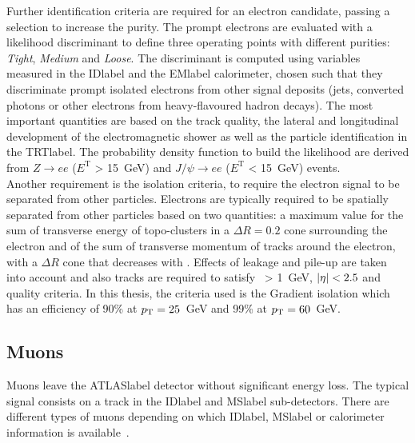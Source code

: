 Further identification criteria are required for an electron candidate, passing a selection to increase the purity. The prompt electrons are evaluated with a likelihood discriminant to define three operating points with different purities: \textit{Tight}, \textit{Medium} and \textit{Loose}. The discriminant is computed using variables measured in the \acrshort{IDlabel} and the \acrshort{EMlabel} calorimeter, chosen such that they discriminate prompt isolated electrons from other signal deposits (jets, converted photons or other electrons from heavy-flavoured hadron decays). The most important quantities are based on the track quality, the lateral and longitudinal development of the electromagnetic shower as well as the particle identification in the \acrshort{TRTlabel}. The probability density function to build the likelihood are derived from $Z\rightarrow ee$ ($E^\text{T}$ > 15~GeV) and $J/\psi \rightarrow ee$ ($E^\text{T}$ < 15~GeV) events.\\

Another requirement is the isolation criteria, to require the electron signal to be separated from other particles. Electrons are typically required to be spatially separated from other particles based on two quantities: a maximum value for the sum of transverse energy of topo-clusters in a $\Delta R=0.2$ cone surrounding the electron and of the sum of transverse momentum of tracks around the electron, with a $\Delta R$ cone that decreases with \pT. Effects of leakage and pile-up are taken into account and also tracks are required to satisfy \pT\ > 1~GeV, $\abs{\eta}<2.5$ and quality criteria. In this thesis, the criteria used is the Gradient isolation which has an efficiency of 90\% at $p_{\text{T}} = 25$~GeV and 99\% at $p_{\text{T}} = 60$~GeV.

\subsection{Muons}

Muons leave the \acrshort{ATLASlabel} detector without significant energy loss. The typical signal consists on a track in the \acrshort{IDlabel} and \acrshort{MSlabel} sub-detectors. There are different types of muons depending on which \acrshort{IDlabel}, \acrshort{MSlabel} or calorimeter information is available~\cite{performancemu}.\\

